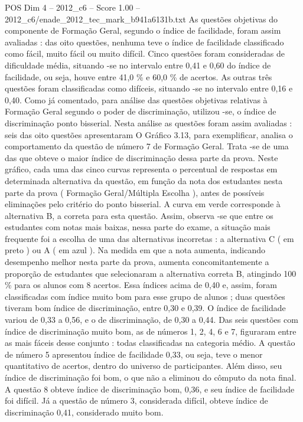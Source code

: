 \begin{textsample}{POS Dim 4 – 2012\_c6 – Score 1.00 – 2012\_c6/enade\_2012\_tec\_mark\_b941a6131b.txt}
As questões objetivas do componente de Formação Geral, segundo o índice de facilidade, foram assim avaliadas : das oito questões, nenhuma teve o índice de facilidade classificado como fácil, muito fácil ou muito difícil.
Cinco questões foram consideradas de dificuldade média, situando -se no intervalo entre 0,41 e 0,60 do índice de facilidade, ou seja, houve entre 41,0 \% e 60,0 \% de acertos.
As outras três questões foram classificadas como difíceis, situando -se no intervalo entre 0,16 e 0,40.
Como já comentado, para análise das questões objetivas relativas à Formação Geral segundo o poder de discriminação, utilizou -se, o índice de discriminação ponto bisserial.
Nesta análise as questões foram assim avaliadas : seis das oito questões apresentaram O Gráfico 3.13, para exemplificar, analisa o comportamento da questão de número 7 de Formação Geral.
Trata -se de uma das que obteve o maior índice de discriminação dessa parte da prova.
Neste gráfico, cada uma das cinco curvas representa o percentual de respostas em determinada alternativa da questão, em função da nota dos estudantes nesta parte da prova ( Formação Geral/Múltipla Escolha ), antes de possíveis eliminações pelo critério do ponto bisserial.
A curva em verde corresponde à alternativa B, a correta para esta questão.
Assim, observa -se que entre os estudantes com notas mais baixas, nessa parte do exame, a situação mais frequente foi a escolha de uma das alternativas incorretas : a alternativa C ( em preto ) ou A ( em azul ).
Na medida em que a nota aumenta, indicando desempenho melhor nesta parte da prova, aumenta concomitantemente a proporção de estudantes que selecionaram a alternativa correta B, atingindo 100 \% para os alunos com 8 acertos.
Essa índices acima de 0,40 e, assim, foram classificadas com índice muito bom para esse grupo de alunos ; duas questões tiveram bom índice de discriminação, entre 0,30 e 0,39.
O índice de facilidade variou de 0,33 a 0,56, e o de discriminação, de 0,30 a 0,44.
Das seis questões com índice de discriminação muito bom, as de números 1, 2, 4, 6 e 7, figuraram entre as mais fáceis desse conjunto : todas classificadas na categoria médio.
A questão de número 5 apresentou índice de facilidade 0,33, ou seja, teve o menor quantitativo de acertos, dentro do universo de participantes.
Além disso, seu índice de discriminação foi bom, o que não a eliminou do cômputo da nota final.
A questão 8 obteve índice de discriminação bom, 0,36, e seu índice de facilidade foi difícil.
Já a questão de número 3, considerada difícil, obteve índice de discriminação 0,41, considerado muito bom.

\end{textsample}
